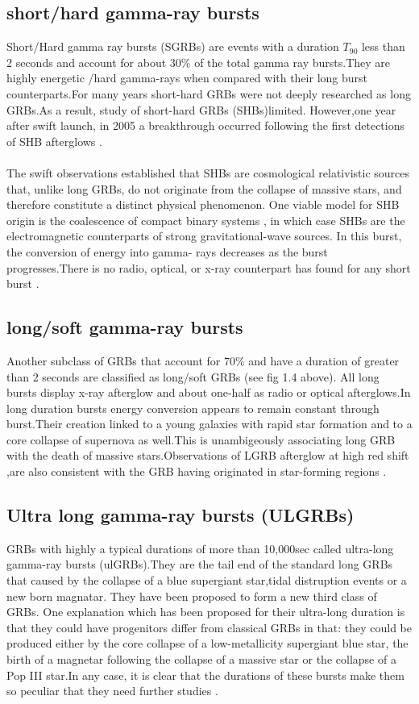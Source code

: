 \subsection{short/hard gamma-ray bursts} 
Short/Hard gamma ray bursts (SGRBs) are events with a duration $T_{90}$ less than 2
seconds and account for about 30\% of the total gamma ray bursts.They are highly
energetic /hard gamma-rays when compared with their long burst counterparts.For
many years short-hard GRBs were not deeply researched as long GRBs.As a result,
study of short-hard GRBs (SHBs)limited. However,one year after swift launch, in
2005 a breakthrough occurred following the first detections of SHB afterglows \citep{5}\citep{6}.\\\\
The swift observations established that SHBs are cosmological relativistic sources
that, unlike long GRBs, do not originate from the collapse of massive stars, and
therefore constitute a distinct physical phenomenon. One viable model for SHB
origin is the coalescence of compact binary systems , in which case SHBs are the
electromagnetic counterparts of strong gravitational-wave sources. In this burst,
the conversion of energy into gamma- rays decreases as the burst progresses.There
is no radio, optical, or x-ray counterpart has found for any short burst \citep{5}.
\subsection{long/soft gamma-ray bursts} 
Another subclass of GRBs that account for 70\% and have a duration of greater than
2 seconds are classified as long/soft GRBs (see fig 1.4 above). All long bursts display x-ray afterglow and about one-half as radio or optical afterglows.In long duration bursts energy conversion appears to remain constant through burst.Their creation linked to a young galaxies with rapid star formation and to a core collapse of supernova as well.This is unambigeously associating long GRB with the death of massive stars.Observations of LGRB afterglow at high red shift ,are also consistent with the GRB having originated in star-forming regions \citep{6}.
\subsection{Ultra long gamma-ray bursts (ULGRBs)}
GRBs with highly a typical durations of more than 10,000sec called ultra-long
gamma-ray bursts (ulGRBs).They are the tail end of the standard long GRBs that
caused by the collapse of a blue supergiant star,tidal distruption events or a new
born magnatar. They have been proposed to form a new third class of GRBs. One
explanation which has been proposed for their ultra-long duration is that they
could have progenitors differ from classical GRBs in that: they could be produced
either by the core collapse of a low-metallicity supergiant blue star, the birth of a
magnetar following the collapse of a massive star or the collapse of a Pop III star.In any case, it is clear that the durations of these bursts make them so peculiar that they need further studies \citep{10} \citep{11}.
